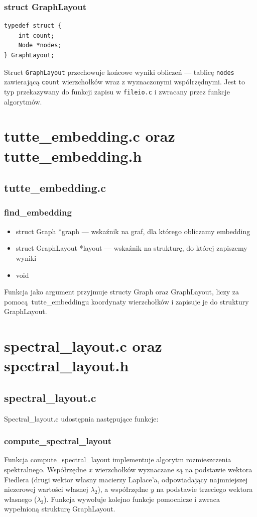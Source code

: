 \documentclass[12pt]{article}
\begin{document}
\subsubsection{struct GraphLayout}
\begin{lstlisting}
typedef struct {
    int count;
    Node *nodes;
} GraphLayout;
\end{lstlisting}
Struct \texttt{GraphLayout} przechowuje końcowe wyniki obliczeń --- tablicę \texttt{nodes}
zawierającą \texttt{count} wierzchołków wraz z wyznaczonymi współrzędnymi. Jest to typ
przekazywany do funkcji zapisu w \texttt{fileio.c} i zwracany przez funkcje algorytmów.
\section{tutte\_embedding.c oraz tutte\_embedding.h}
\subsection{tutte\_embedding.c}
\subsubsection{find\_embedding}
\begin{itemize}
	\item struct Graph *graph --- wskaźnik na graf, dla którego obliczamy embedding
	\item struct GraphLayout *layout --- wskaźnik na strukturę, do której zapiszemy wyniki
\end{itemize}
\begin{itemize}
	\item void
\end{itemize}
Funkcja jako argument przyjmuje structy Graph oraz GraphLayout, liczy za
pomocą tutte\_embeddingu koordynaty wierzchołków i zapisuje je do struktury
GraphLayout.


\section{spectral\_layout.c oraz spectral\_layout.h}
\subsection{spectral\_layout.c}
Spectral\_layout.c udostępnia następujące funkcje:
\subsubsection{compute\_spectral\_layout}
Funkcja compute\_spectral\_layout implementuje algorytm rozmieszczenia spektralnego.
Współrzędne $x$ wierzchołków wyznaczane są na podstawie wektora Fiedlera (drugi wektor
własny macierzy Laplace'a, odpowiadający najmniejszej niezerowej wartości własnej $\lambda_2$),
a współrzędne $y$ na podstawie trzeciego wektora własnego ($\lambda_3$). Funkcja wywołuje
kolejno funkcje pomocnicze i zwraca wypełnioną strukturę GraphLayout.
\end{document}
